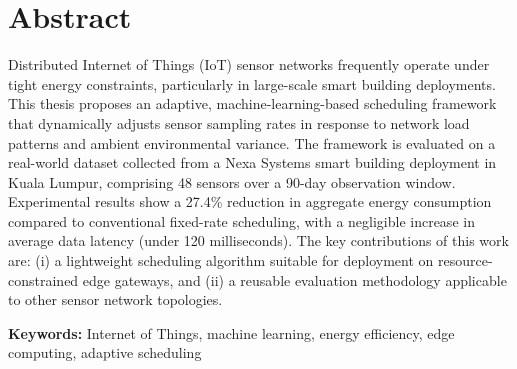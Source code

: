 \chapter*{Abstract}

Distributed Internet of Things (IoT) sensor networks frequently operate under tight energy
constraints, particularly in large-scale smart building deployments. This thesis proposes an
adaptive, machine-learning-based scheduling framework that dynamically adjusts sensor sampling
rates in response to network load patterns and ambient environmental variance. The framework is
evaluated on a real-world dataset collected from a Nexa Systems smart building deployment in
Kuala Lumpur, comprising 48 sensors over a 90-day observation window. Experimental results show a
27.4\% reduction in aggregate energy consumption compared to conventional fixed-rate scheduling,
with a negligible increase in average data latency (under 120 milliseconds). The key contributions
of this work are: (i) a lightweight scheduling algorithm suitable for deployment on
resource-constrained edge gateways, and (ii) a reusable evaluation methodology applicable to other
sensor network topologies.

\medskip
\noindent\textbf{Keywords:} Internet of Things, machine learning, energy efficiency, edge
computing, adaptive scheduling

